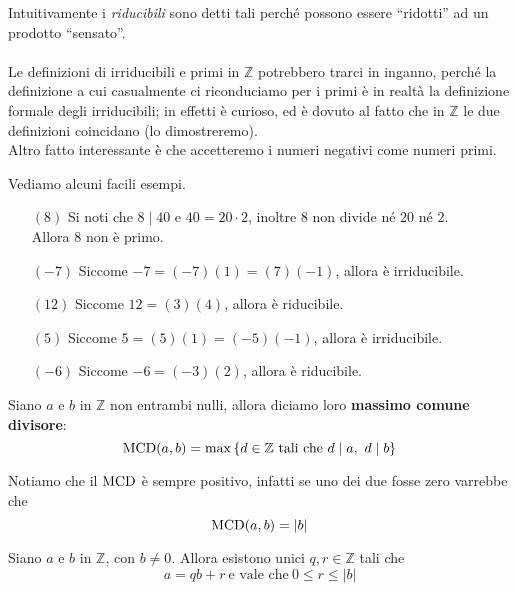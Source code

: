 Intuitivamente i \textit{riducibili} sono detti tali perché possono essere \enquote{ridotti} ad un prodotto \enquote{sensato}. \\ \\ Le definizioni di irriducibili e primi in $\mathbb{Z}$ potrebbero trarci in inganno, perché la definizione a cui casualmente ci riconduciamo per i primi è in realtà la definizione formale degli irriducibili; in effetti è curioso, ed è dovuto al fatto che in $\mathbb{Z}$ le due definizioni coincidano (lo dimostreremo). \\ Altro fatto interessante è che accetteremo i numeri negativi come numeri primi.
\begin{esempio} Vediamo alcuni facili esempi.
	\begin{itemize}
		\item[$(8)$] Si noti che $8\mid 40$ e $40=20\cdot 2$, inoltre $8$ non divide né $20$ né $2$. \\
		Allora 8 non è primo.
		\item[$(-7)$] Siccome $-7 = (-7)(1)=(7)(-1)$, allora è irriducibile.
		\item[$(12)$] Siccome $12 = (3)(4)$, allora è riducibile. 
		\item[$(5)$] Siccome $5 = (5)(1)=(-5)(-1)$, allora è irriducibile. 
		\item[$(-6)$] Siccome $-6 = (-3)(2)$, allora è riducibile. 
	\end{itemize}
\end{esempio}
\begin{definizione}[$\MCD$] Siano $a$ e $b$ in $\mathbb{Z}$ non entrambi nulli, allora diciamo loro \textbf{massimo comune divisore}:
	\begin{equation*}
		\operatorname{\mathrm{MCD}}(a,b)=\max\left\{d \in \mathbb{Z} \ \text{tali che} \ d\mid a, \ d\mid b\right\}
	\end{equation*}
\end{definizione}
\begin{osservazione}
	Notiamo che il $\MCD$ è sempre positivo, infatti se uno dei due fosse zero varrebbe che \begin{equation*}
	\operatorname{\mathrm{MCD}}(a,b)= |b|
	\end{equation*}
\end{osservazione}
\begin{teorema} Siano $a$ e $b$ in $\mathbb{Z}$, con $b \neq 0$. Allora esistono unici $q,r \in \mathbb{Z}$ tali che 
	\begin{equation*}
	a = qb + r \ \text{e vale che} \ 0 \leq r \leq |b|
	\end{equation*}
\end{teorema}
